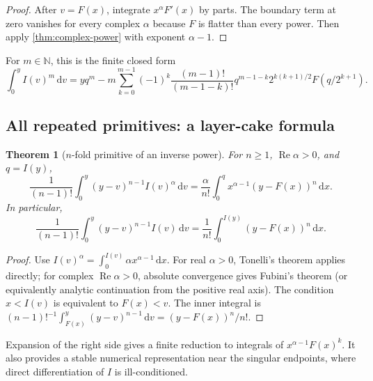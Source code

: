 \documentclass[11pt]{article}
\newtheorem{theorem}{Theorem}[section]
\theoremstyle{definition}
\theoremstyle{remark}
\DeclareMathOperator{\RePart}{Re}
\newcommand{\N}{\mathbb N}
\newcommand{\dd}{\,\mathrm d}
\begin{document}
\begin{proof}
After \(v=F(x)\), integrate \(x^\alpha F'(x)\) by parts.  The boundary term at zero
vanishes for every complex \(\alpha\) because \(F\) is flatter than every power.  Then
apply \cref{thm:complex-power} with exponent \(\alpha-1\).
\end{proof}

For \(m\in\N\), this is the finite closed form
\begin{equation}
 \int_0^yI(v)^m\dd v
 =yq^m-m\sum_{k=0}^{m-1}(-1)^k
   \frac{(m-1)!}{(m-1-k)!}q^{m-1-k}
   2^{k(k+1)/2}F(q/2^{k+1}).                              \label{eq:inverse-integer-power}
\end{equation}

\subsection{All repeated primitives: a layer-cake formula}

\begin{theorem}[\(n\)-fold primitive of an inverse power]
\label{thm:inverse-nfold}
For \(n\ge1\), \(\RePart\alpha>0\), and \(q=I(y)\),
\begin{equation}
 \frac1{(n-1)!}\int_0^y(y-v)^{n-1}I(v)^\alpha\dd v
 =\frac{\alpha}{n!}\int_0^q x^{\alpha-1}(y-F(x))^n\dd x. \label{eq:inverse-nfold}
\end{equation}
In particular,
\begin{equation}
 \frac1{(n-1)!}\int_0^y(y-v)^{n-1}I(v)\dd v
 =\frac1{n!}\int_0^{I(y)}(y-F(x))^n\dd x.                \label{eq:inverse-nfold-alpha1}
\end{equation}
\end{theorem}

\begin{proof}
Use
\(
 I(v)^\alpha=\int_0^{I(v)}\alpha x^{\alpha-1}\dd x
\).  For real \(\alpha>0\), Tonelli's theorem applies directly; for complex
\(\RePart\alpha>0\), absolute convergence gives Fubini's theorem (or equivalently
analytic continuation from the positive real axis).  The condition \(x<I(v)\) is equivalent to \(F(x)<v\).  The
inner integral is
\(
 (n-1)!^{-1}\int_{F(x)}^y(y-v)^{n-1}\dd v=(y-F(x))^n/n!.
\)
\end{proof}

Expansion of the right side gives a finite reduction to integrals of
\(x^{\alpha-1}F(x)^k\).  It also provides a stable numerical representation near the
singular endpoints, where direct differentiation of \(I\) is ill-conditioned.
\end{document}
